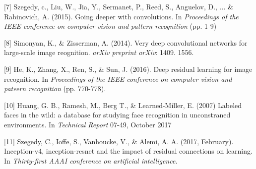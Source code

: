 \documentclass{article}
\begin{document}
[7] Szegedy, c., Liu, W., Jia, Y., Sermanet, P., Reed, S., Anguelov, D., ... \& Rabinovich, A. (2015). Going deeper with convolutions. In {\it Proceedings of the IEEE conference on computer vision and pattern recognition} (pp. 1-9)

[8] Simonyan, K., \& Zisserman, A. (2014). Very deep convolutional networks for large-scale image reognition. {\it arXiv preprint arXiv}: 1409. 1556.

[9] He, K., Zhang, X., Ren, S., \& Sun, J. (2016). Deep residual learning for image recognition. In {\it Proceedings of the IEEE conference on computer vision and pateern recognition} (pp. 770-778).

[10] Huang, G. B., Ramesh, M., Berg T., \& Learned-Miller, E. (2007) Labeled faces in the wild: a database for studying face recognition in unconstraned environments. In {\it Technical Report} 07-49, October 2017

[11] Szegedy, C., Ioffe, S., Vanhoucke, V., \& Alemi, A. A. (2017, February). Inception-v4, inception-resnet and the impact of residual connections on learning. In {\it Thirty-first AAAI conference on artificial intelligence}.
\end{document}
